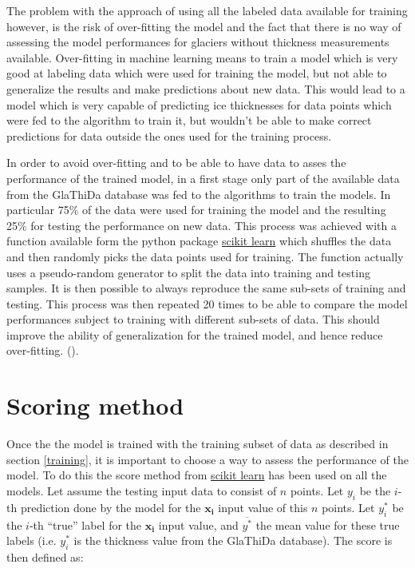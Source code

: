 The problem with the approach of using all the labeled data available for training however, is the risk of over-fitting the model and the fact that there is no way of assessing the model performances for glaciers without thickness measurements available.
Over-fitting in machine learning means to train a model which is very good at labeling data which were used for training the model, but not able to generalize the results and make predictions about new data. This would lead to a model which is very capable of predicting ice thicknesses for data points which were fed to the algorithm to train it, but wouldn't be able to make correct predictions for data outside the ones used for the training process. 

In order to avoid over-fitting and to be able to have data to asses the performance of the trained model, in a first stage only part of the available data from the GlaThiDa database was fed to the algorithms to train the models. In particular 75\% of the data were used for training the model and the resulting 25\% for testing the performance on new data. This process was achieved with a function available form the python package \href{https://scikit-learn.org/}{scikit learn} which shuffles the data and then randomly picks the data points used for training. The function actually uses a pseudo-random generator to split the data into training and testing samples. It is then possible to always reproduce the same sub-sets of training and testing. This process was then repeated 20 times to be able to compare the model performances subject to training with different sub-sets of data. This should improve the ability of generalization for the trained model, and hence reduce over-fitting. (\citet{crossval1995}).

\section{Scoring method}\label{scoring}
Once the the model is trained with the training subset of data as described in section \ref{training}, it is important to choose a way to assess the performance of the model. To do this the score method from \href{https://scikit-learn.org/}{scikit learn} has been used on all the models. Let assume the testing input data to consist of $n$ points. Let $y_i$ be the $i$-th prediction done by the model for the $\mathbf{x_i}$ input value of this $n$ points. Let $y^*_i$ be the $i$-th ``true'' label for the $\mathbf{x_i}$ input value, and $\overline{y^*}$ the mean value for these true labels (i.e. $y^*_i$ is the thickness value from the GlaThiDa database). The score is then defined as:

